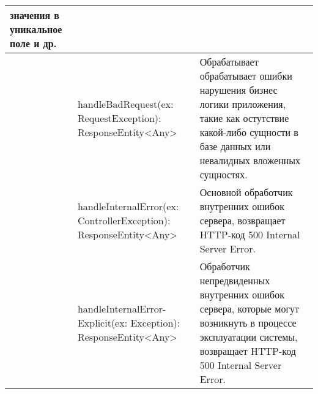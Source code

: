 \begin{center}
\begin{longtable}{ 
      | >{\centering}m{} 
      | >{\centering}m{} 
      | >{\centering\arraybackslash}m{}|}
  	значения в уникальное поле и др.\\
  \cline{2-3}
  	& handleBadRequest(ex: RequestException): ResponseEntity<Any>
  	& Обрабатывает обрабатывает ошибки нарушения бизнес логики приложения, такие как остутствие какой-либо сущности
  	в базе данных или невалидных вложенных сущностях. \\
  \cline{2-3}
  	& handleInternalError(ex: ControllerException): ResponseEntity<Any>
  	& Основной обработчик внутренних ошибок сервера, возвращает HTTP-код 500 Internal Server Error. \\
  \cline{2-3}
  	& handleInternalError-Explicit(ex: Exception): ResponseEntity<Any>
  	& Обработчик непредвиденных внутренних ошибок сервера, которые могут возникнуть в процессе эксплуатации системы, 
  	возвращает HTTP-код 500 Internal Server Error. \\
  \end{longtable}
\end{center}
